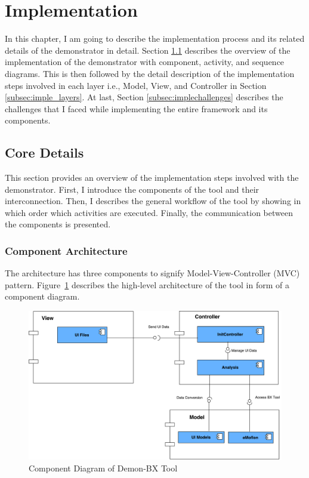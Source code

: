 \section{Implementation}\label{sec:implementation}
In this chapter, I am going to describe the implementation process and its related details of the demonstrator in detail. Section \ref{subsec:coredetails} describes the overview of the implementation of the demonstrator with component, activity, and sequence diagrams. This is then followed by the detail description of the implementation steps involved in each layer i.e., Model, View, and Controller in Section \ref{subsec:imple_layers}. At last, Section \ref{subsec:implechallenges} describes the challenges that I faced while implementing the entire framework and its components.

\subsection{Core Details}\label{subsec:coredetails}
This section provides an overview of the implementation steps involved with the demonstrator. First, I introduce the components of the tool and their interconnection. Then, I describes the general workflow of the tool by showing in which order which activities are executed. Finally, the communication between the components is presented.

\subsubsection{Component Architecture}\label{subsubsec:component}
The architecture has three components to signify Model-View-Controller (MVC) pattern. Figure~\ref{fig:Component_Diagram} describes the high-level architecture of the tool in form of a component diagram.

\begin{figure}
	\includegraphics[width=1\textwidth]{figures/Component_Diagram}
	\caption{Component Diagram of Demon-BX Tool}
	\label{fig:Component_Diagram}
\end{figure}

